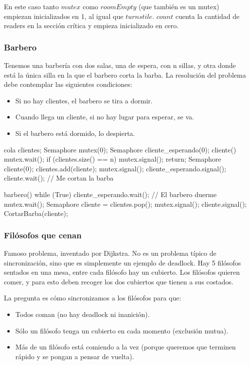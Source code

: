 \documentclass{article}
\begin{document}
En este caso tanto $mutex$ como $roomEmpty$ (que tambi\'en es un mutex) empiezan inicializados en 1, al igual que $turnstile$. $count$ cuenta la cantidad de readers en la secci\'on cr\'itica y empieza inicializado en cero.

\subsubsection{Barbero}

Tenemos una barbería con dos salas, una de espera, con n sillas, y otra donde está la única silla en la que el barbero corta la barba. La resolución del problema debe contemplar las siguientes condiciones:

\begin{itemize}
 \item Si no hay clientes, el barbero se tira a dormir.
 \item Cuando llega un cliente, si no hay lugar para esperar, se va.
 \item Si el barbero está dormido, lo despierta.
\end{itemize}


\begin{code}
cola clientes;
Semaphore mutex(0);
Semaphore cliente_esperando(0);
cliente() {
    mutex.wait();
    if (clientes.size() == n) {
        mutex.signal();
        return;
    }
    Semaphore cliente(0);
    clientes.add(cliente);
    mutex.signal();
    cliente_esperando.signal();
    cliente.wait();
    // Me cortan la barba
}

barbero() {
    while (True) {
        cliente_esperando.wait(); // El barbero duerme
        mutex.wait();
        Semaphore cliente = clientes.pop();
        mutex.signal();
        cliente.signal();
        CortarBarba(cliente);
    }
}
\end{code}

\subsubsection{Filósofos que cenan}

Famoso problema, inventado por Dijkstra. No es un problema típico de sincronización, sino que es simplemente un ejemplo de deadlock. Hay 5 filósofos sentados en una mesa, entre cada filósofo hay un cubierto. Los filósofos quieren comer, y para esto deben recoger los dos cubiertos que tienen a sus costados.

La pregunta es cómo sincronizamos a los filósofos para que:
\begin{itemize}
 \item Todos coman (no hay deadlock ni inanición).
 \item Sólo un filósofo tenga un cubierto en cada momento (exclusión mutua).
 \item Más de un filósofo está comiendo a la vez (porque queremos que terminen rápido y se pongan a pensar de vuelta).
\end{itemize}
\end{document}

